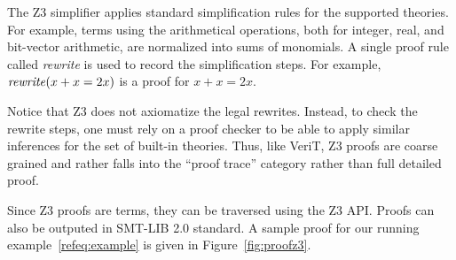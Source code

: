 \documentclass{llncs}
\begin{document}
The Z3 simplifier applies standard simplification rules for the
supported theories. For example, terms using the arithmetical operations,
both for integer, real, and bit-vector arithmetic, are normalized into sums of monomials.
A single proof rule called \emph{rewrite} is used to record the simplification steps.
For example, $\mbox{\emph{rewrite}}(x + x = 2 x)$ is a proof for $x + x = 2x$.

Notice that Z3 does not axiomatize the legal rewrites.
Instead, to check the rewrite steps, one must rely on a
proof checker to be able to apply similar inferences for the set of built-in theories.
Thus, like VeriT, Z3 proofs are coarse grained and rather falls into the “proof trace”
category rather than full detailed proof.

Since Z3 proofs are terms, they can be traversed using the Z3 API.
Proofs can also be outputed in SMT-LIB 2.0 standard. A sample proof
for our running example~\ref{refeq:example} is given in
Figure~\ref{fig:proofz3}.
\end{document}
